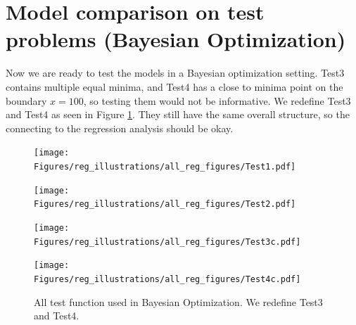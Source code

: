 \section{Model comparison on test problems (Bayesian Optimization)}
Now we are ready to test the models in a Bayesian optimization setting. Test3 contains multiple
equal minima, and Test4 has a close to minima point on the boundary $x=100$, so testing them would
not be informative. We redefine Test3 and Test4 as seen in Figure \ref{TEST_problems2}. They still
have the same overall structure, so the connecting to the regression analysis should be okay. 

\begin{figure}[b]
  \centering
  \begin{minipage}[b]{0.24\textwidth}
   \texttt{[image: Figures/reg\_illustrations/all\_reg\_figures/Test1.pdf]}
  \end{minipage}
  \hfill
  \begin{minipage}[b]{0.24\textwidth}
    \texttt{[image: Figures/reg\_illustrations/all\_reg\_figures/Test2.pdf]}
   \end{minipage}
   \hfill
   \begin{minipage}[b]{0.24\textwidth}
    \texttt{[image: Figures/reg\_illustrations/all\_reg\_figures/Test3c.pdf]}
   \end{minipage}
   \hfill
   \begin{minipage}[b]{0.24\textwidth}
     \texttt{[image: Figures/reg\_illustrations/all\_reg\_figures/Test4c.pdf]}
    \end{minipage}
  \caption{All test function used in Bayesian Optimization. We redefine Test3 and Test4.}
  \label{TEST_problems2}
\end{figure}

